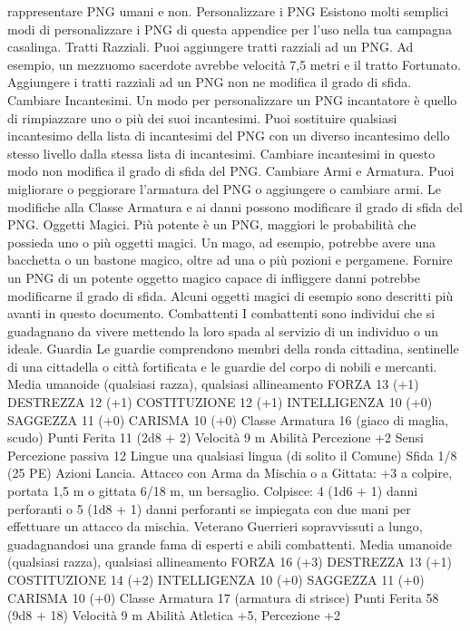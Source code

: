 \begin{multicols}{2}
rappresentare PNG umani e non.
Personalizzare i PNG
Esistono molti semplici modi di personalizzare i PNG di
questa appendice per l’uso nella tua campagna
casalinga.
Tratti Razziali. Puoi aggiungere tratti razziali ad un
PNG. Ad esempio, un mezzuomo sacerdote avrebbe
velocità 7,5 metri e il tratto Fortunato. Aggiungere i tratti
razziali ad un PNG non ne modifica il grado di sfida.
Cambiare Incantesimi. Un modo per personalizzare
un PNG incantatore è quello di rimpiazzare uno o più
dei suoi incantesimi. Puoi sostituire qualsiasi
incantesimo della lista di incantesimi del PNG con un
diverso incantesimo dello stesso livello dalla stessa
lista di incantesimi. Cambiare incantesimi in questo
modo non modifica il grado di sfida del PNG.
Cambiare Armi e Armatura. Puoi migliorare o
peggiorare l’armatura del PNG o aggiungere o
cambiare armi. Le modifiche alla Classe Armatura e ai
danni possono modificare il grado di sfida del PNG.
Oggetti Magici. Più potente è un PNG, maggiori le
probabilità che possieda uno o più oggetti magici. Un
mago, ad esempio, potrebbe avere una bacchetta o un
bastone magico, oltre ad una o più pozioni e
pergamene. Fornire un PNG di un potente oggetto
magico capace di infliggere danni potrebbe modificarne
il grado di sfida.
Alcuni oggetti magici di esempio sono descritti più
avanti in questo documento.
Combattenti
I combattenti sono individui che si guadagnano da
vivere mettendo la loro spada al servizio di un individuo
o un ideale.
Guardia
Le guardie comprendono membri della ronda cittadina,
sentinelle di una cittadella o città fortificata e le guardie
del corpo di nobili e mercanti.
Media umanoide (qualsiasi razza), qualsiasi allineamento
FORZA 13 (+1)
DESTREZZA 12 (+1)
COSTITUZIONE 12 (+1)
INTELLIGENZA 10 (+0)
SAGGEZZA 11 (+0)
CARISMA 10 (+0)
Classe Armatura 16 (giaco di maglia, scudo)
Punti Ferita 11 (2d8 + 2)
Velocità 9 m
Abilità Percezione +2
Sensi Percezione passiva 12
Lingue una qualsiasi lingua (di solito il Comune)
Sfida 1/8 (25 PE)
Azioni
Lancia. Attacco con Arma da Mischia o a Gittata: +3 a colpire,
portata 1,5 m o gittata 6/18 m, un bersaglio.
Colpisce: 4 (1d6 + 1) danni perforanti o 5 (1d8 + 1) danni
perforanti se impiegata con due mani per effettuare un attacco da
mischia.
Veterano
Guerrieri sopravvissuti a lungo, guadagnandosi una
grande fama di esperti e abili combattenti.
Media umanoide (qualsiasi razza), qualsiasi allineamento
FORZA 16 (+3)
DESTREZZA 13 (+1)
COSTITUZIONE 14 (+2)
INTELLIGENZA 10 (+0)
SAGGEZZA 11 (+0)
CARISMA 10 (+0)
Classe Armatura 17 (armatura di strisce)
Punti Ferita 58 (9d8 + 18)
Velocità 9 m
Abilità Atletica +5, Percezione +2

\end{multicols}
